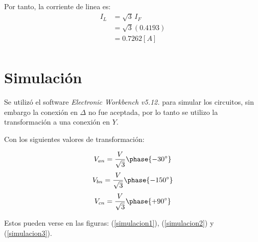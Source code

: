 \documentclass[letter,11pt]{article}
\begin{document}
Por tanto, la corriente de linea es:
\begin{equation*}
    \begin{split}
        I_L&=\sqrt{3}\,I_F\\
           &=\sqrt{3}(0.4193)\\
           &=0.7262[A]\\
    \end{split}
\end{equation*}

\section{Simulación}
Se utilizó el software \emph{Electronic Workbench v5.12.} para simular
los circuitos, sin embargo la conexión en $\Delta$ no fue aceptada, por lo tanto
se utilizo la transformación a una conexión en $Y$.

Con los siguientes valores de transformación:

\begin{equation*}
    V_{an} = \frac{V}{\sqrt{3}}\phase{-30^{\circ}}
\end{equation*}
\begin{equation*}
    V_{bn} = \frac{V}{\sqrt{3}}\phase{-150^{\circ}}
\end{equation*}
\begin{equation*}
    V_{cn} = \frac{V}{\sqrt{3}}\phase{+90^{\circ}}
\end{equation*}

Estos pueden verse en las figuras: (\ref{simulacion1}), (\ref{simulacion2}) y
(\ref{simulacion3}).
\end{document}
